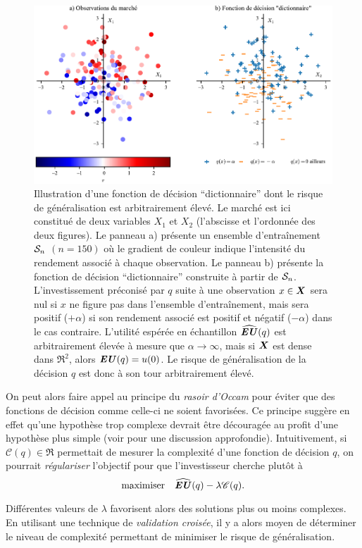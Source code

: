 \begin{figure}
  \centering
  \includegraphics[width=\textwidth]{../experiments/fig/demo_1.pdf}
  \caption[Décision dictionnaire]{Illustration d'une fonction de décision ``dictionnaire''
    dont le risque de généralisation est arbitrairement élevé. Le marché est ici constitué
    de deux variables $X_1$ et $X_2$ (l'abscisse et l'ordonnée des deux figures). Le
    panneau a) présente un ensemble d'entraînement $\S_n$ $(n=150)$ où le gradient de
    couleur indique l'intensité du rendement associé à chaque observation. Le panneau b)
    présente la fonction de décision ``dictionnaire'' construite à partir de
    $\S_n$. L'investissement préconisé par $q$ suite à une observation $x\in\X$ sera nul si
    $x$ ne figure pas dans l'ensemble d'entraînement, mais sera positif ($+\alpha$) si son
    rendement associé est positif et négatif ($-\alpha$) dans le cas contraire. L'utilité
    espérée en échantillon $\hEU(q)$ est arbitrairement élevée à mesure que
    $\alpha\to\infty$, mais si $\X$ est dense dans $\Re^2$, alors $\EU(q) = u(0)$. Le risque de
    généralisation de la décision $q$ est donc à son tour arbitrairement élevé.}
  \label{fig_demo1}
\end{figure}

On peut alors faire appel au principe du \textit{rasoir d'Occam} pour éviter que des
fonctions de décision comme celle-ci ne soient favorisées. Ce principe suggère en effet
qu'une hypothèse trop complexe devrait être découragée au profit d'une hypothèse plus
simple (voir \cite{vapnik1998statistical} pour une discussion approfondie). Intuitivement,
si $\mathscr{C}(q) \in \Re$ permettait de mesurer la complexité d'une fonction de décision
$q$, on pourrait \textit{régulariser} l'objectif pour que l'investisseur cherche plutôt à
\begin{equation}
  \maximizeEquation{\hEU(q) - \lambda\mathscr{C}(q).}
\end{equation}
Différentes valeurs de $\lambda$ favorisent alors des solutions plus ou moins complexes. En
utilisant une technique de \textit{validation croisée}, il y a alors moyen de déterminer
le niveau de complexité permettant de minimiser le risque de généralisation.

